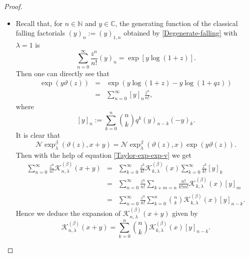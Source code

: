 \documentclass{birkjour}
\theoremstyle{definition}
\theoremstyle{remark}
\numberwithin{equation}{section}
\begin{document}
\begin{proof}
\begin{itemize}
$${{\xi_{q})^{(k)}(0)}{k!}z^{k}},$$ we obtain
$$\begin{array}{lll}
\displaystyle{\sum^{\infty}_{n=0}\frac{z^{n}}{n!}\mathcal{K}^{(\beta)}_{n,
\lambda}(x+y)}
&=&\displaystyle{\sum^{\infty}_{k=0}\frac{z^{k}}{k!}\mathcal{K}^{(\beta)}_{k,
\lambda}(x)
\sum^{\infty}_{l=0}\frac{z^{l}}{l!}\mathcal{K}^{(\beta)}_{l,
\lambda}(y)
\sum^{\infty}_{m=0}\frac{z^{m}}{m!}\mathcal{K}^{(\beta)}_{m, \lambda}(x)}\\
&=&\displaystyle{\sum^{\infty}_{n=0}\frac{z^{n}}{n!}\sum_{k+l+m=n}
\frac{n!}{k!l!m!}\mathcal{K}^{(\beta)}_{k,
\lambda}(x)\mathcal{K}^{(\beta)}_{l,
\lambda}(x)(e^{\beta}_{\lambda}\circ \xi_{q})^{(m)}(0)}.
\end{array}$$
This gives the statement.
\item [\textbf{(P4)}]
Recall that, for $n\in \mathbb{N}$ and  $y\in \mathbb{C}$, the
generating function of the classical falling factorials
$(y)_{n}:=(y)_{1, n}$ obtained by \eqref{Degenerate-falling} with
$\lambda=1$ is
$$
\displaystyle{\sum^{\infty}_{n=0}\frac{z^{n}}{n!}(y)_{n}=\exp[y\log(1+z)]}.
$$
Then one can directly see that
\begin{eqnarray}\label{Taylor-exp-exp-v}
\exp(y\vartheta(z))&=&\exp(y\log(1+z)-y\log(1+qz))\nonumber\\
&=&\displaystyle{\sum^{\infty}_{n=0}[y]_{n}\frac{z^{n}}{n!}},
\end{eqnarray}
where
$$
[y]_{n}:=\displaystyle{\sum^{n}_{k=0}\binom{n}{k}q^{k}(y)_{n-k}(-y)_{k}}.
$$
It is clear that
$$\mathcal{N}\!\exp^{\beta}_{\lambda}(\vartheta(z), x+y)=\mathcal{N}\!\exp^{\beta}_{\lambda}(\vartheta(z), x)\exp(y\vartheta(z)).$$
Then with the help of equation \eqref{Taylor-exp-exp-v} we get
$$\begin{array}{lll}
\displaystyle{\sum^{\infty}_{n=0}\frac{z^{n}}{n!}\mathcal{K}^{(\beta)}_{n,
\lambda}(x+y)}&=&
\displaystyle{\sum^{\infty}_{k=0}\frac{z^{k}}{k!}\mathcal{K}^{(\beta)}_{k, \lambda}(x)\sum^{\infty}_{k=0}\frac{z^{k}}{k!}[y]_{k}}\\
&=&\displaystyle{\sum^{\infty}_{n=0}\frac{z^{n}}{n!}\sum_{k+m=n}\frac{n!}{k!m!}\mathcal{K}^{(\beta)}_{k, \lambda}(x)[y]_{m}}\\
&=&\displaystyle{\sum^{\infty}_{n=0}\frac{z^{n}}{n!}\sum^{n}_{k=0}
\binom{n}{k}\mathcal{K}^{(\beta)}_{k, \lambda}(x)[y]_{n-k}}.
\end{array}$$
Hence we deduce the expansion of $\mathcal{K}^{(\beta)}_{n,
\lambda}(x+y)$ given by
$$\mathcal{K}^{(\beta)}_{n, \lambda}(x+y)=\displaystyle{\sum^{n}_{k=0}
\binom{n}{k} \mathcal{K}^{(\beta)}_{k, \lambda}(x)[y]_{n-k}}.$$
\end{itemize}
\end{proof}
\end{document}
